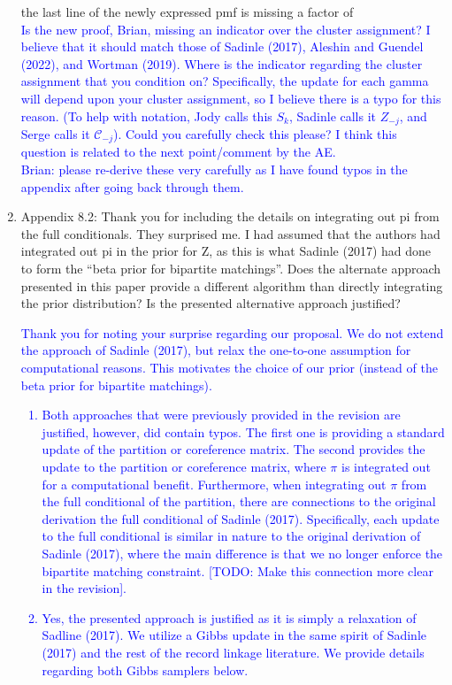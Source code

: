 \documentclass{article}
\newcommand{\C}{\mathcal{C}}
\begin{document}
\begin{enumerate}
	the last line of the newly expressed pmf is missing a factor of \\
	\textcolor{blue}{Is the new proof, Brian, missing an indicator over the cluster assignment? I believe that it should match those 
	of Sadinle (2017), Aleshin and Guendel (2022), and Wortman (2019). Where is the indicator regarding the cluster assignment that you condition on? Specifically, the update for each gamma will depend upon your cluster assignment, so I believe there is a typo for this reason. (To help with notation,  Jody calls this $S_k$, Sadinle calls it $Z_{-j}$, and Serge calls it $\C_{-j}$). Could you carefully check this please? I think this question is related to the next point/comment by the AE.} \\
	
	\textcolor{blue}{Brian: please re-derive these very carefully as I have found typos in the appendix after going back through them.}
    \item Appendix 8.2: Thank you for including the details on integrating out pi from the full
conditionals. They surprised me. I had assumed that the authors had integrated out pi in the
prior for Z, as this is what Sadinle (2017) had done to form the “beta prior for bipartite
matchings”. Does the alternate approach presented in this paper provide a different algorithm
than directly integrating the prior distribution? Is the presented alternative approach justified? \\
\textcolor{blue}{
Thank you for noting your surprise regarding our proposal. We do not extend the approach of Sadinle (2017), but relax the one-to-one assumption for computational reasons. This motivates the choice of our prior (instead of the beta prior for bipartite matchings). 
\begin{enumerate}
\item Both approaches that were previously provided in the revision are justified, however, did contain typos. The first one is providing a standard update of the partition or coreference matrix. The second provides the update to the partition or coreference matrix, where $\pi$ is integrated out for a computational benefit. Furthermore, when integrating out $\pi$ from the full conditional of the partition, there are connections to the original derivation the full conditional of Sadinle (2017). Specifically, each update to the full conditional is similar in nature to the original derivation of Sadinle (2017), where the main difference is that we no longer enforce the bipartite matching constraint. [TODO: Make this connection more clear in the revision].
\item Yes, the presented approach is justified as it is simply a relaxation of Sadline (2017). We utilize a Gibbs update in the same spirit of Sadinle (2017) and the rest of the record linkage literature. We provide details regarding both Gibbs samplers below.
\end{enumerate}
}


\end{enumerate}
\end{document}
